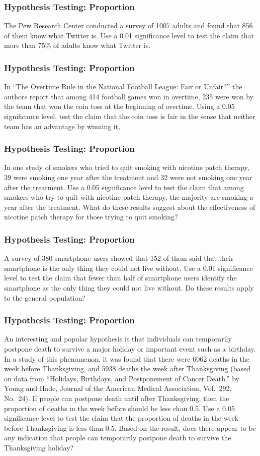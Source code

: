 \documentclass[xcolor=dvipsnames]{beamer}
\begin{document}
\begin{frame}
  \frametitle{Hypothesis Testing: Proportion} 
  {\ubung} The Pew Research Center conducted a survey of 1007 adults
  and found that 856 of them know what Twitter is. Use a 0.01
  significance level to test the claim that more than 75\% of adults
  know what Twitter is.
\end{frame}

\begin{frame}
  \frametitle{Hypothesis Testing: Proportion}
  {\ubung} In ``The Overtime Rule in the National Football League:
  Fair or Unfair?'' the authors report that among 414 football games
  won in overtime, 235 were won by the team that won the coin toss at
  the beginning of overtime. Using a 0.05 significance level, test the
  claim that the coin toss is fair in the sense that neither team has
  an advantage by winning it.
\end{frame}

\begin{frame}
  \frametitle{Hypothesis Testing: Proportion}
  {\ubung} In one study of smokers who tried to quit smoking with
  nicotine patch therapy, 39 were smoking one year after the treatment
  and 32 were not smoking one year after the treatment. Use a 0.05
  significance level to test the claim that among smokers who try to
  quit with nicotine patch therapy, the majority are smoking a year
  after the treatment. What do these results suggest about the
  effectiveness of nicotine patch therapy for those trying to quit
  smoking?
\end{frame}

\begin{frame}
  \frametitle{Hypothesis Testing: Proportion}
  {\ubung} A survey of 380 smartphone users showed that 152 of them
  said that their smartphone is the only thing they could not live
  without. Use a 0.01 significance level to test the claim that fewer
  than half of smartphone users identify the smartphone as the only
  thing they could not live without. Do these results apply to the
  general population?
\end{frame}

\begin{frame}
  \frametitle{Hypothesis Testing: Proportion}
  {\ubung} An interesting and popular hypothesis is that individuals
  can temporarily postpone death to survive a major holiday or
  important event such as a birthday. In a study of this phenomenon,
  it was found that there were 6062 deaths in the week before
  Thanksgiving, and 5938 deaths the week after Thanksgiving (based on
  data from ``Holidays, Birthdays, and Postponement of Cancer Death.''
  by Young and Hade, Journal of the American Medical Association,
  Vol.\ 292, No.\ 24). If people can postpone death until after
  Thanksgiving, then the proportion of deaths in the week before
  should be less chan 0.5. Use a 0.05 significance level to test the
  claim that the proportion of deaths in the week before Thanksgiving
  is less than 0.5. Based on the result, does there appear to be any
  indication that people can temporarily postpone death to survive the
  Thanksgiving holiday?
\end{frame}
\end{document}
